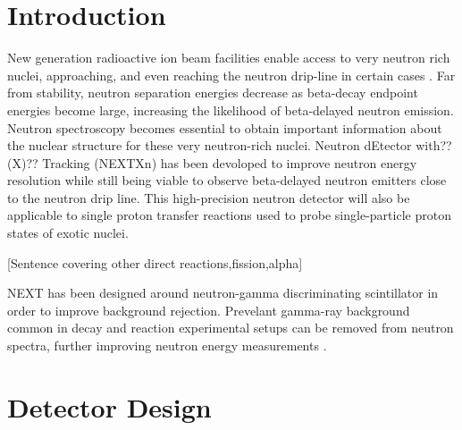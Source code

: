 \documentclass[preprint,3p,twocolumn]{elsarticle}
\begin{document}
\linenumbers

\section{Introduction}
New generation radioactive ion beam facilities enable access to very neutron rich nuclei, approaching, and even reaching the neutron drip-line in certain
cases \cite{FRIB}.
Far from stability, neutron separation energies decrease as beta-decay endpoint energies become large, increasing the likelihood of beta-delayed neutron emission. Neutron spectroscopy becomes essential to obtain important information about the nuclear structure for these very neutron-rich nuclei. 
Neutron dEtector with??(X)?? Tracking (NEXTXn) has been devoloped to improve neutron energy resolution while still being viable to observe beta-delayed neutron emitters close to the neutron drip line. 
This high-precision neutron detector will also be applicable to single proton transfer reactions used to probe single-particle proton states of exotic nuclei.
\begin{center}
[Sentence covering other direct reactions,fission,alpha]
\end{center}
NEXT has been designed around neutron-gamma discriminating scintillator in order to improve background rejection. Prevelant gamma-ray background common in decay and reaction experimental setups can be removed from neutron spectra, further improving neutron energy measurements \cite{FEBBRARO2018189}.


\section{Detector Design}
\end{document}
